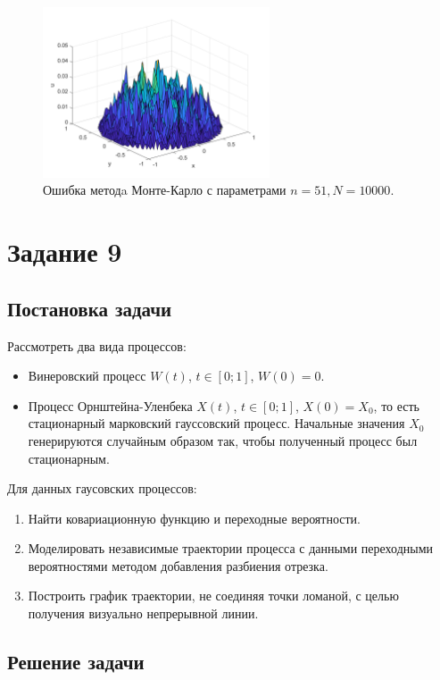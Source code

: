 \documentclass[oneside, final, 12pt]{article}
\begin{document}
    \begin{figure}[h!]
		\centering
		\includegraphics[width=0.6\textwidth]{../code/Task_8/pict/e_51_10000_ex.png}
		\caption{Ошибка методa Монте-Карло с параметрами $n = 51, N = 10000$. }
    \end{figure}
	
\newpage

\section{Задание 9}

\subsection{Постановка задачи}
	Рассмотреть два вида процессов:
	\begin{itemize}
		\item Винеровский процесс $W(t)$, $t \in [0;1]$, $W(0) = 0$.
		\item Процесс Орнштейна-Уленбека $X(t)$, $t \in [0;1]$, $X(0)=X_0$, то есть стационарный марковский 
				гауссовский процесс. Начальные значения $X_0$ генерируются случайным образом так, чтобы
				полученный процесс был стационарным.  
	\end{itemize}
	Для данных гаусовских процессов: 
    \begin{enumerate} 
        \item Найти ковариационную функцию и переходные вероятности.  
        \item Моделировать независимые траектории процесса с данными переходными вероятностями 
        		методом добавления разбиения отрезка. 
        \item Построить график траектории, не соединяя точки ломаной, с целью получения визуально
        		непрерывной линии.
    \end{enumerate}
\subsection{Решение задачи}
\end{document}
